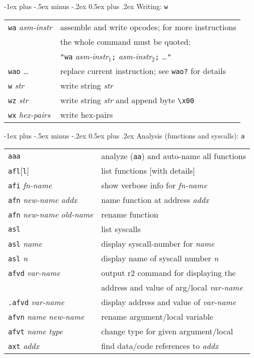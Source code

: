 \documentclass[a4paper,landscape]{article}
\makeatletter
\renewcommand{\section}{\@startsection{section}{1}{0mm}%
                                {-1ex plus -.5ex minus -.2ex}%
                                {0.5ex plus .2ex}%
                                {\normalfont\large\bfseries}}
\makeatother
\begin{document}
\begin{multicols*}{3}
\section{Writing: \texttt{w}}
\begin{tabular}{@{}ll@{}}
\texttt{wa} \textit{asm-instr} & assemble and write opcodes; for more instructions \\ &
	the whole command must be quoted: \\ &
\texttt{"wa} \textit{asm-instr$_1$}\texttt{;} \textit{asm-instr$_2$}\texttt{;} \ldots\texttt{"} \\
\texttt{wao} \textit{\ldots} & replace current instruction; see \texttt{wao?} for details \\
\texttt{w} \textit{str} & write string \textit{str} \\
\texttt{wz} \textit{str} & write string \textit{str} and append byte \texttt{\textbackslash x00} \\
\texttt{wx} \textit{hex-pairs} & write hex-pairs \\
\end{tabular}

\section{Analysis (functions and syscalls): \texttt{a}}
\begin{tabular}{@{}ll@{}}
\texttt{aaa} & analyze (\texttt{aa}) and auto-name all functions \\
\texttt{afl}[\texttt{l}] & list functions [with details] \\
\texttt{afi} \textit{fn-name} & show verbose info for \textit{fn-name} \\
\texttt{afn} \textit{new-name} \textit{addx} & name function at address \textit{addx} \\
\texttt{afn} \textit{new-name} \textit{old-name} & rename function \\
\texttt{asl} & list syscalls \\
\texttt{asl} \textit{name} & display syscall-number for \textit{name} \\
\texttt{asl} \textit{n} & display name of syscall number \textit{n} \\
\texttt{afvd} \textit{var-name} & output r2 command for displaying the \\ & address and value of arg/local \textit{var-name} \\
\texttt{.afvd} \textit{var-name} & display address and value of \textit{var-name} \\
\texttt{afvn} \textit{name} \textit{new-name} & rename argument/local variable \\
\texttt{afvt} \textit{name} \textit{type} & change type for given argument/local \\
\texttt{axt} \textit{addx} & find data/code references to \textit{addx} \\
\end{tabular}

\end{multicols*}
\end{document}
